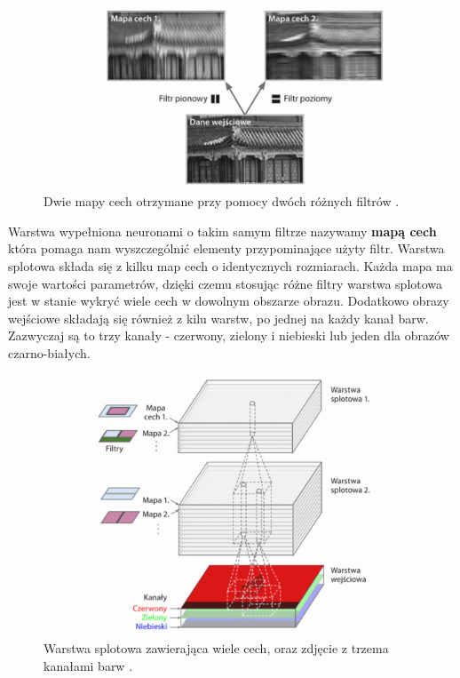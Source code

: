 \documentclass{article}
\begin{document}
\begin{itemize}
\begin{figure}[H]
\centering
\includegraphics[scale=0.6]{filtr.png}
\caption{Dwie mapy cech otrzymane przy pomocy dwóch różnych filtrów \cite{um}.}
\end{figure}

Warstwa wypełniona neuronami o takim
samym filtrze nazywamy \textbf{mapą cech} która pomaga nam wyszczególnić elementy przypominające
użyty filtr. Warstwa splotowa składa się z kilku map cech o identycznych rozmiarach.
Każda mapa ma swoje wartości parametrów, dzięki czemu stosując różne filtry 
warstwa splotowa jest w stanie wykryć wiele cech w dowolnym obszarze obrazu.
Dodatkowo obrazy wejściowe składają się również z kilu warstw, po jednej na każdy kanał
barw. Zazwyczaj są to trzy kanały - czerwony, zielony i niebieski lub jeden dla obrazów
czarno-białych.


\begin{figure}[H]
\centering
\includegraphics[scale=0.6]{rgb_cnn.png}
\caption{Warstwa splotowa zawierająca wiele cech, oraz zdjęcie z trzema kanałami barw \cite{um}.}
\end{figure}


\end{itemize}
\end{document}
